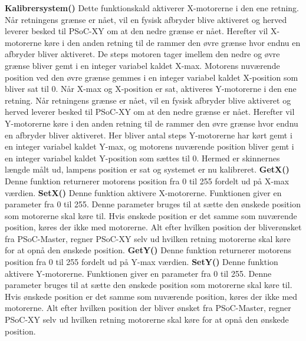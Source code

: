 \textbf{Kalibrer\textunderscore{}system()}\newline 
Dette funktionskald aktiverer X-motorerne i den ene retning. Når retningens grænse er nået, vil en fysisk afbryder blive aktiveret og herved leverer besked til PSoC-XY om at den nedre grænse er nået. Herefter vil X-motorerne køre i den anden retning til de rammer den øvre grænse hvor endnu en afbryder bliver aktiveret. \newline 
De steps motoren tager imellem den nedre og øvre grænse bliver gemt i en integer variabel kaldet X-max. Motorens nuværende position ved den øvre grænse gemmes i en integer variabel kaldet X-position som bliver sat til 0. \newline 
Når X-max og X-position er sat, aktiveres Y-motorerne i den ene retning. Når retningens grænse er nået, vil en fysisk afbryder blive aktiveret og herved leverer besked til PSoC-XY om at den nedre grænse er nået. Herefter vil Y-motorerne køre i den anden retning til de rammer den øvre grænse hvor endnu en afbryder bliver aktiveret. \newline 
Her bliver antal steps Y-motorerne har kørt gemt i en integer variabel kaldet Y-max, og motorens nuværende position bliver gemt i en integer variabel kaldet Y-position som sættes til 0. 
Hermed er skinnernes længde målt ud, lampens position er sat og systemet er nu kalibreret.   \newline  
\textbf{Get\textunderscore{}X()}\newline 
Denne funktion returnerer motorens position fra 0 til 255 fordelt ud på X-max værdien.  \newline 
\textbf{Set\textunderscore{}X()}\newline 
Denne funktion aktivere X-motorerne. Funktionen giver en parameter fra 0 til 255. Denne parameter bruges til at sætte den ønskede position som motorerne skal køre til. Hvis ønskede position er det samme som nuværende position, køres der ikke med motorerne. Alt efter hvilken position der bliverønsket fra PSoC-Master, regner PSoC-XY selv ud hvilken retning motorerne skal køre for at opnå den ønskede position. \newline  
\textbf{Get\textunderscore{}Y()}\newline 
Denne funktion returnerer motorens position fra 0 til 255 fordelt ud på Y-max værdien.  \newline 
\textbf{Set\textunderscore{}Y()}\newline 
Denne funktion aktivere Y-motorerne. Funktionen giver en parameter fra 0 til 255. Denne parameter bruges til at sætte den ønskede position som motorerne skal køre til. Hvis ønskede position er det samme som nuværende position, køres der ikke med motorerne. Alt efter hvilken position der bliver ønsket fra PSoC-Master, regner PSoC-XY selv ud hvilken retning motorerne skal køre for at opnå den ønskede position.  \newline 
